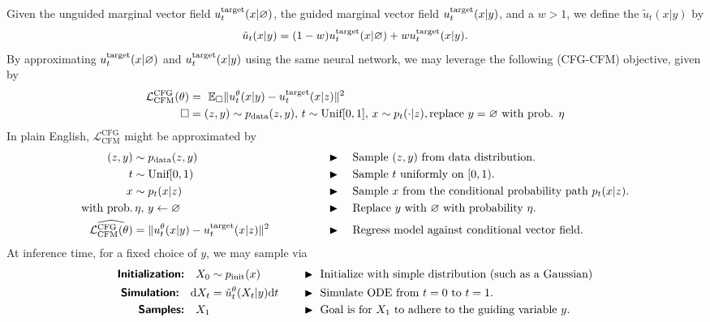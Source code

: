 \begin{summarybox}
Given the unguided marginal vector field $u^{\text{target}}_t(x|\varnothing)$, the guided marginal vector field $u^{\text{target}}_t(x|y)$, and a  $w > 1$, we define the  $\tilde{u}_t(x|y)$ by 
\begin{equation}
    \tilde{u}_t(x|y) = (1-w) u^{\text{target}}_t(x|\varnothing) + w u^{\text{target}}_t(x|y).
    \label{eq:flow_cfg}
\end{equation}
By approximating $u^{\text{target}}_t(x|\varnothing)$ and $u^{\text{target}}_t(x|y)$ using the same neural network, we may leverage the following  (CFG-CFM) objective, given by
\begin{align}
    \label{eq:cfg_guided_cfm}
    \mathcal{L}_{\text{CFM}}^{\text{CFG}}(\theta) &= \,\,\mathbb{E}_{\square} \lVert u_t^{\theta}(x|y) - u^{\text{target}}_t(x|z)\rVert^2\\
    \square &= (z,y) \sim p_{\text{data}}(z,y),\, t \sim \text{Unif}[0,1],\, x \sim p_t(\cdot|z),\text{replace }y=\varnothing\text{ with prob. }\eta
\end{align}
In plain English, $\mathcal{L}_{\text{CFM}}^{\text{CFG}}$ might be approximated by
\begin{alignat*}{3}
    (z,y) &\sim p_{\rm{data}}(z,y) \quad\quad\quad\quad && \blacktriangleright \quad \text{Sample $(z,y)$ from data distribution.}\\
    t &\sim \text{Unif}[0,1) \quad\quad\quad\quad && \blacktriangleright \quad \text{Sample $t$ uniformly on $[0,1)$.}\\
    x &\sim p_t(x|z) \quad\quad\quad\quad && \blacktriangleright \quad \text{Sample $x$ from the conditional probability path $p_t(x|z)$.}\\
    \text{with prob.}&\,\eta,\, y \gets \varnothing \quad\quad\quad\quad && \blacktriangleright \quad \text{Replace $y$ with $\varnothing$ with probability $\eta$.}\\
    \widehat{\mathcal{L}_{\text{CFM}}^{\text{CFG}}(\theta)} &=  \lVert u_t^{\theta}(x|y) - u^{\text{target}}_t(x|z)\rVert^2 \quad\quad\quad\quad && \blacktriangleright \quad \text{Regress model against conditional vector field.}
\end{alignat*}
At inference time, for a fixed choice of $y$, we may sample via
\begin{alignat*}{3}
    \textbf{\sffamily Initialization:}\quad X_0&\sim\pinit(x) \quad  && \blacktriangleright\,\,\text{Initialize with simple distribution (such as a Gaussian)}\\
    \textbf{\sffamily Simulation:}\quad \dd X_t &= \tilde{u}_t^\theta(X_t|y)\dd t \quad && \blacktriangleright\,\,\text{Simulate ODE from $t=0$ to $t=1$.}\\
    \textbf{\sffamily Samples:}\quad X_1& \quad && \blacktriangleright\,\,\text{Goal is for $X_1$ to adhere to the guiding variable $y$.}
\end{alignat*}
\end{summarybox}
